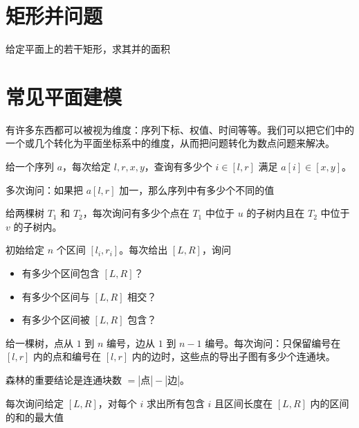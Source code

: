 \section{矩形并问题}

\begin{example}[矩形面积并]
    给定平面上的若干矩形，求其并的面积
\end{example}

\begin{exercise}
\end{exercise}

\begin{exercise}[矩形并的周长]
\end{exercise}



\section{常见平面建模}

有许多东西都可以被视为维度：序列下标、权值、时间等等。我们可以把它们中的一个或几个转化为平面坐标系中的维度，从而把问题转化为数点问题来解决。

\begin{example}[序列 $\times$ 值域]
    给一个序列 $a$，每次给定 $l,r,x,y$，查询有多少个 $i\in [l,r]$ 满足 $a[i] \in [x,y]$。
\end{example}

\begin{example}
    多次询问：如果把 $a[l,r]$ 加一，那么序列中有多少个不同的值
\end{example}

\begin{example}[序列 $\times$ 序列]
    给两棵树 $T_1$ 和 $T_2$，每次询问有多少个点在 $T_1$ 中位于 $u$ 的子树内且在 $T_2$ 中位于 $v$ 的子树内。
\end{example}

\begin{example}[区间包含关系]
    初始给定 $n$ 个区间 $[l_i,r_i]$。每次给出 $[L,R]$，询问
    \begin{itemize}
        \item 有多少个区间包含 $[L,R]$？
        \item 有多少个区间与 $[L,R]$ 相交？
        \item 有多少个区间被 $[L,R]$ 包含？
    \end{itemize}
\end{example}
\begin{example}
    给一棵树，点从 $1$ 到 $n$ 编号，边从 $1$ 到 $n-1$ 编号。每次询问：只保留编号在 $[l,r]$ 内的点和编号在 $[l,r]$ 内的边时，这些点的导出子图有多少个连通块。
    \begin{hint}
        森林的重要结论是连通块数 $=|点| - |边|$。
    \end{hint}
\end{example}
\begin{example}
    每次询问给定 $[L,R]$，对每个 $i$ 求出所有包含 $i$ 且区间长度在 $[L,R]$ 内的区间的和的最大值
\end{example}


